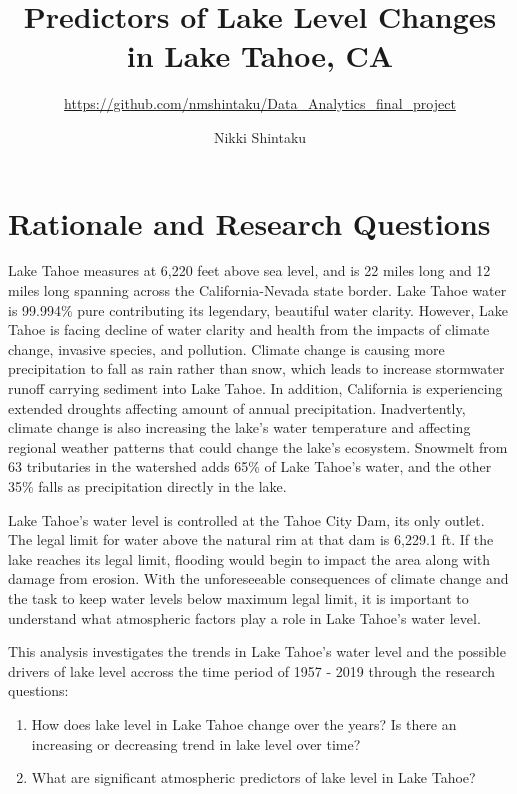 \documentclass[12pt,]{article}
\title{Predictors of Lake Level Changes in Lake Tahoe, CA}
\subtitle{\url{https://github.com/nmshintaku/Data_Analytics_final_project}}
\author{Nikki Shintaku}
\date{}
\begin{document}
\maketitle

\newpage
\tableofcontents 
\newpage
\listoftables 
\newpage
\listoffigures 
\newpage

\hypertarget{rationale-and-research-questions}{%
\section{Rationale and Research
Questions}\label{rationale-and-research-questions}}

Lake Tahoe measures at 6,220 feet above sea level, and is 22 miles long
and 12 miles long spanning across the California-Nevada state border.
Lake Tahoe water is 99.994\% pure contributing its legendary, beautiful
water clarity. However, Lake Tahoe is facing decline of water clarity
and health from the impacts of climate change, invasive species, and
pollution. Climate change is causing more precipitation to fall as rain
rather than snow, which leads to increase stormwater runoff carrying
sediment into Lake Tahoe. In addition, California is experiencing
extended droughts affecting amount of annual precipitation.
Inadvertently, climate change is also increasing the lake's water
temperature and affecting regional weather patterns that could change
the lake's ecosystem. Snowmelt from 63 tributaries in the watershed adds
65\% of Lake Tahoe's water, and the other 35\% falls as precipitation
directly in the lake.

Lake Tahoe's water level is controlled at the Tahoe City Dam, its only
outlet. The legal limit for water above the natural rim at that dam is
6,229.1 ft. If the lake reaches its legal limit, flooding would begin to
impact the area along with damage from erosion. With the unforeseeable
consequences of climate change and the task to keep water levels below
maximum legal limit, it is important to understand what atmospheric
factors play a role in Lake Tahoe's water level.

This analysis investigates the trends in Lake Tahoe's water level and
the possible drivers of lake level accross the time period of 1957 -
2019 through the research questions:

\begin{enumerate}
\def\labelenumi{\arabic{enumi}.}
\item
  How does lake level in Lake Tahoe change over the years? Is there an
  increasing or decreasing trend in lake level over time?
\item
  What are significant atmospheric predictors of lake level in Lake
  Tahoe?
\end{enumerate}
\end{document}
